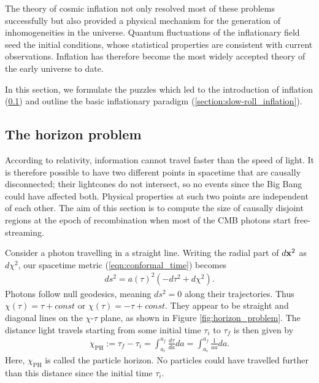 The theory of cosmic inflation not only resolved most of these problems successfully but also provided a physical mechanism for the generation of inhomogeneities in the universe. Quantum fluctuations of the inflationary field seed the initial conditions, whose statistical properties are consistent with current observations. Inflation has therefore become the most widely accepted theory of the early universe to date.

In this section, we formulate the puzzles which led to the introduction of inflation (\ref{section:the_horizon_problem}) and outline the basic inflationary paradigm (\ref{section:slow-roll_inflation}).

\subsection{The horizon problem}
\label{section:the_horizon_problem}

According to relativity, information cannot travel faster than the speed of light. It is therefore possible to have two different points in spacetime that are causally disconnected; their lightcones do not intersect, so no events since the Big Bang could have affected both. Physical properties at such two points are independent of each other. The aim of this section is to compute the size of causally disjoint regions at the epoch of recombination when most of the CMB photons start free-streaming.

Consider a photon travelling in a straight line. Writing the radial part of $d\mathbf{x}^2$ as $d\chi^2$, our spacetime metric (\ref{eqn:conformal_time}) becomes
\begin{align}
	ds^2 = a(\tau)^2 (-d\tau^2 +d\chi^2).
\end{align}
Photons follow null geodesics, meaning $ds^2=0$ along their trajectories. Thus $\chi(\tau) = \tau + const$ or $\chi(\tau) = -\tau + const$. They appear to be straight and diagonal lines on the $\chi$-$\tau$ plane, as shown in Figure \ref{fig:horizon_problem}. The distance light travels starting from some initial time $\tau_i$ to $\tau_f$ is then given by
\begin{align}
	\chi_\text{PH} := \tau_f - \tau_i = \int_{a_i}^{a_f} \frac{d\tau}{da} da = \int_{a_i}^{a_f} \frac{1}{a\dot{a}} da. \label{def:physical_horizon}
\end{align}
Here, $\chi_\text{PH}$ is called the particle horizon. No particles could have travelled further than this distance since the initial time $\tau_i$.

